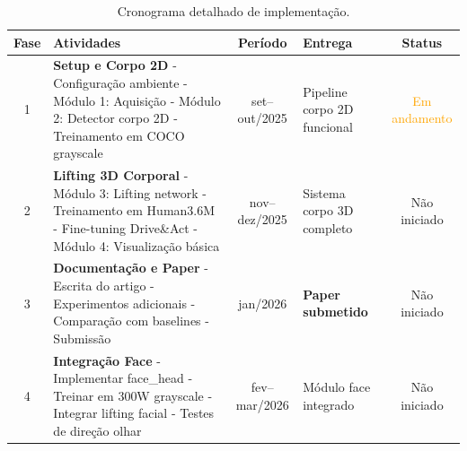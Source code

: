 \documentclass[12pt, a4paper]{article}
\begin{document}
\begin{table}[H]
    \centering
    \caption{Cronograma detalhado de implementação.}
    \label{tab:cronograma_impl}
    \small
    \begin{tabular}{|c|p{5.5cm}|c|p{2.8cm}|c|}
        \hline
        \textbf{Fase} & \textbf{Atividades} & \textbf{Período} & \textbf{Entrega} & \textbf{Status} \\ \hline
        
        1 & \textbf{Setup e Corpo 2D}
        \newline - Configuração ambiente
        \newline - Módulo 1: Aquisição
        \newline - Módulo 2: Detector corpo 2D
        \newline - Treinamento em COCO grayscale & 
        set--out/2025 & 
        Pipeline corpo 2D funcional & 
        \textcolor{orange}{Em andamento} \\ \hline
        
        2 & \textbf{Lifting 3D Corporal}
        \newline - Módulo 3: Lifting network
        \newline - Treinamento em Human3.6M
        \newline - Fine-tuning Drive\&Act
        \newline - Módulo 4: Visualização básica &
        nov--dez/2025 &
        Sistema corpo 3D completo &
        Não iniciado \\ \hline
        
        3 & \textbf{Documentação e Paper}
        \newline - Escrita do artigo
        \newline - Experimentos adicionais
        \newline - Comparação com baselines
        \newline - Submissão &
        jan/2026 &
        \textbf{Paper submetido} &
        Não iniciado \\ \hline
        
        4 & \textbf{Integração Face}
        \newline - Implementar face\_head
        \newline - Treinar em 300W grayscale
        \newline - Integrar lifting facial
        \newline - Testes de direção olhar &
        fev--mar/2026 &
        Módulo face integrado &
        Não iniciado \\ \hline
        

\end{tabular}
\end{table}
\end{document}
